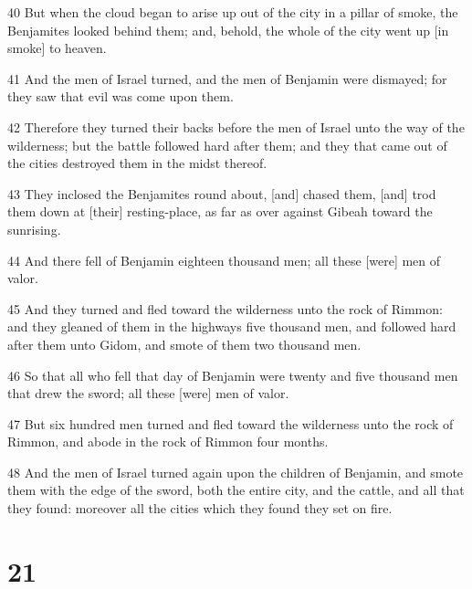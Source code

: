 \par 40 But when the cloud began to arise up out of the city in a pillar of smoke, the Benjamites looked behind them; and, behold, the whole of the city went up [in smoke] to heaven.
\par 41 And the men of Israel turned, and the men of Benjamin were dismayed; for they saw that evil was come upon them.
\par 42 Therefore they turned their backs before the men of Israel unto the way of the wilderness; but the battle followed hard after them; and they that came out of the cities destroyed them in the midst thereof.
\par 43 They inclosed the Benjamites round about, [and] chased them, [and] trod them down at [their] resting-place, as far as over against Gibeah toward the sunrising.
\par 44 And there fell of Benjamin eighteen thousand men; all these [were] men of valor.
\par 45 And they turned and fled toward the wilderness unto the rock of Rimmon: and they gleaned of them in the highways five thousand men, and followed hard after them unto Gidom, and smote of them two thousand men.
\par 46 So that all who fell that day of Benjamin were twenty and five thousand men that drew the sword; all these [were] men of valor.
\par 47 But six hundred men turned and fled toward the wilderness unto the rock of Rimmon, and abode in the rock of Rimmon four months.
\par 48 And the men of Israel turned again upon the children of Benjamin, and smote them with the edge of the sword, both the entire city, and the cattle, and all that they found: moreover all the cities which they found they set on fire.

\chapter{21}

